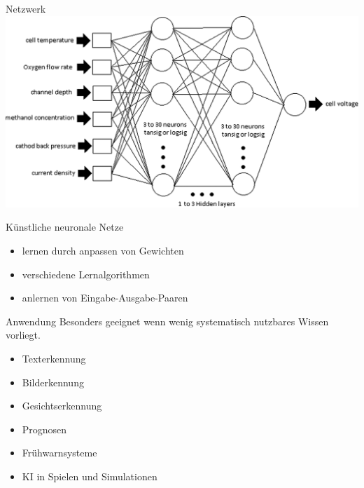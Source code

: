 \begin{slide}{Netzwerk}
	\includegraphics[width=\textwidth,height=0.8\textheight,keepaspectratio]{content/knn_fuel}
\end{slide}

\begin{slide}{Künstliche neuronale Netze}
	\begin{itemize}
		\item lernen durch anpassen von Gewichten
		\item verschiedene Lernalgorithmen
		\item anlernen von Eingabe-Ausgabe-Paaren
	\end{itemize}
\end{slide}


\begin{slide}{Anwendung}
	Besonders geeignet wenn wenig systematisch nutzbares Wissen vorliegt.
	\begin{itemize}
		\item Texterkennung
		\item Bilderkennung
		\item Gesichtserkennung
		\item Prognosen
		\item Frühwarnsysteme
		\item KI in Spielen und Simulationen
	\end{itemize}
\end{slide}
